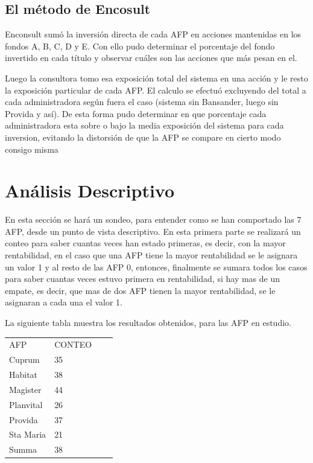 \subsection{El m\'etodo de Encosult}
Enconsult sum\'o la inversi\'on directa de cada AFP en acciones mantenidas en los fondos A, B, C, D y E. Con ello pudo determinar el porcentaje del fondo invertido en cada t\'itulo y observar cu\'ales son las acciones que m\'as pesan en el.

Luego la consultora tomo esa exposici\'on total del sistema en una acci\'on y le resto la exposici\'on particular de cada AFP. El calculo se efectu\'o excluyendo del total a cada administradora seg\'un fuera el caso (sistema sin Bansander, luego sin Provida y as\'i). De esta forma pudo determinar en que porcentaje cada administradora esta sobre o bajo la media exposici\'on del sistema para cada inversion, evitando la distorsi\'on de que la AFP se compare en cierto modo consigo misma


\section{An\'alisis Descriptivo}

En esta secci\'on se har\'a un sondeo, para entender como se han comportado las 7 AFP, desde un punto de vista descriptivo.
En esta primera parte se realizar\'a un conteo para saber cuantas veces han estado primeras, es decir, con la mayor rentabilidad, en el caso que una AFP tiene la mayor rentabilidad se le asignara un valor 1 y al resto de las AFP 0, entonces, finalmente se sumara todos los casos para saber cuantas veces estuvo primera en rentabilidad, si hay mas de un empate, es decir, que mas de dos AFP tienen la mayor rentabilidad, se le asignaran a cada una el valor 1.

La siguiente tabla muestra los resultados obtenidos, para las AFP en estudio.

\begin{small}
\begin{center}
\begin{tabular}{|l|l|ll}
\cline{1-2}
AFP & CONTEO &  &  \\
\cline{1-2}
Cuprum & 35 &  &  \\
Habitat & 38 &  &  \\
Magister & 44 &  &  \\
Planvital & 26 &  &  \\
Provida & 37 &  &  \\
Sta Maria & 21 &  &  \\
Summa & 38 &  &  \\
\cline{1-2}
\end{tabular}
\end{center}
\end{small}

